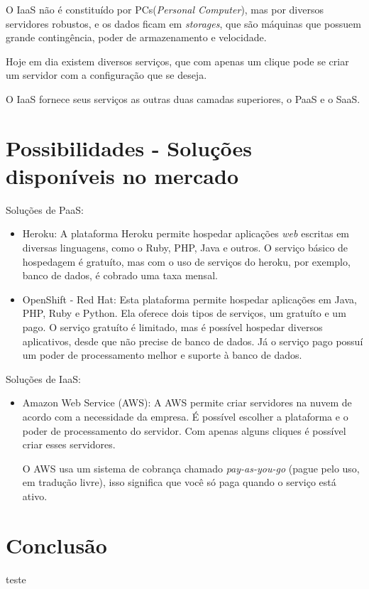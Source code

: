 \documentclass{abnt}
\begin{document}
		O IaaS não é constituído por PCs(\textit{Personal Computer}), mas por diversos servidores robustos, e os dados ficam em \textit{storages}, que são máquinas que possuem grande contingência, poder de armazenamento e velocidade.
		
		Hoje em dia existem diversos serviços, que com apenas um clique pode se criar um servidor com a configuração que se deseja.
		
		O IaaS fornece seus serviços as outras duas camadas superiores, o PaaS e o SaaS.
		 
	\chapter{Possibilidades - Soluções disponíveis no mercado}
		Soluções de PaaS:
		\begin{itemize}
			\item Heroku: A plataforma Heroku permite hospedar aplicações \textit{web} escritas em diversas linguagens, como o Ruby, PHP, Java e outros. O serviço básico de hospedagem é gratuíto, mas com o uso de serviços do heroku, por exemplo, banco de dados, é cobrado uma taxa mensal.
			\item OpenShift - Red Hat: Esta plataforma permite hospedar aplicações em Java, PHP, Ruby e Python. Ela oferece dois tipos de serviços, um gratuíto e um pago. O serviço gratuíto é limitado, mas é possível hospedar diversos aplicativos, desde que não precise de banco de dados. Já o serviço pago possuí um poder de processamento melhor e suporte à banco de dados.
		\end{itemize}
		Soluções de IaaS:
		\begin{itemize}
			\item Amazon Web Service (AWS): A AWS permite criar servidores na nuvem de acordo com a necessidade da empresa. É possível escolher a plataforma e o poder de processamento do servidor. Com apenas alguns cliques é possível criar esses servidores. 
			
			O AWS usa um sistema de cobrança chamado \textit{pay-as-you-go} (pague pelo uso, em tradução livre), isso significa que você só paga quando o serviço está ativo.
		\end{itemize}
		
	\chapter{Conclusão}
		teste
\end{document}

